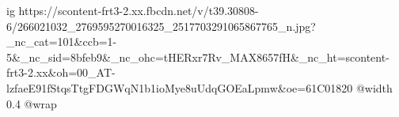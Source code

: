  
 
 
 
 

\ifcmt
  ig https://scontent-frt3-2.xx.fbcdn.net/v/t39.30808-6/266021032_2769595270016325_2517703291065867765_n.jpg?_nc_cat=101&ccb=1-5&_nc_sid=8bfeb9&_nc_ohc=tHERxr7Rv_MAX8657fH&_nc_ht=scontent-frt3-2.xx&oh=00_AT-lzfaeE91fStqsTtgFDGWqN1b1ioMye8uUdqGOEaLpmw&oe=61C01820
  @width 0.4
  @wrap 
\fi
